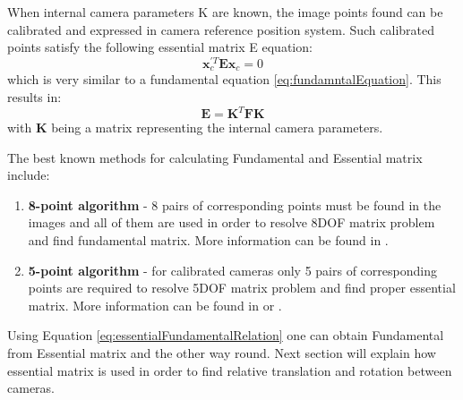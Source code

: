 When internal camera parameters K are known, the image points found can be calibrated and expressed in camera reference position system. Such calibrated points satisfy the following essential matrix E equation:
\begin{equation} \label{eq:essentialEquation}
\textbf{x}_{c}^{'T} \textbf{E} \textbf{x}_{c} = 0
\end{equation} 
which is very similar to a fundamental equation \ref{eq:fundamntalEquation}. This results in:
\begin{equation} \label{eq:essentialFundamentalRelation}
\textbf{E} = \textbf{K}^{T} \textbf{F} \textbf{K}
\end{equation} 
with \textbf{K} being a matrix representing the internal camera parameters. 

The best known methods for calculating Fundamental and Essential matrix include:
\begin{enumerate}
\item{\textbf{8-point algorithm}} - 8 pairs of corresponding points must be found in the images and all of them are used in order to resolve 8DOF matrix problem and find fundamental matrix. More information can be found in \cite{8Point}.
\item{\textbf{5-point algorithm}} - for calibrated cameras only 5 pairs of corresponding points are required to resolve 5DOF matrix problem and find proper essential matrix. More information can be found in \cite{iterative5point} or \cite{Batra5point}.
\end{enumerate}
Using Equation \ref{eq:essentialFundamentalRelation} one can obtain Fundamental from Essential matrix and the other way round. Next section will explain how essential matrix is used in order to find relative translation and rotation between cameras.
